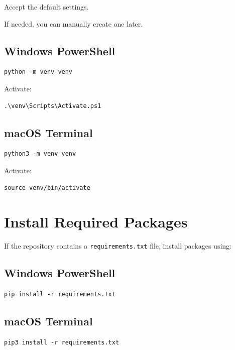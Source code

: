 \documentclass[11pt]{article}
\begin{document}
Accept the default settings.

If needed, you can manually create one later.

\subsection{Windows PowerShell}

\begin{lstlisting}
python -m venv venv
\end{lstlisting}

Activate:

\begin{lstlisting}
.\venv\Scripts\Activate.ps1
\end{lstlisting}

\subsection{macOS Terminal}

\begin{lstlisting}
python3 -m venv venv
\end{lstlisting}

Activate:

\begin{lstlisting}
source venv/bin/activate
\end{lstlisting}

\section{Install Required Packages}

If the repository contains a \texttt{requirements.txt} file, install packages using:

\subsection{Windows PowerShell}

\begin{lstlisting}
pip install -r requirements.txt
\end{lstlisting}

\subsection{macOS Terminal}

\begin{lstlisting}
pip3 install -r requirements.txt
\end{lstlisting}
\end{document}
